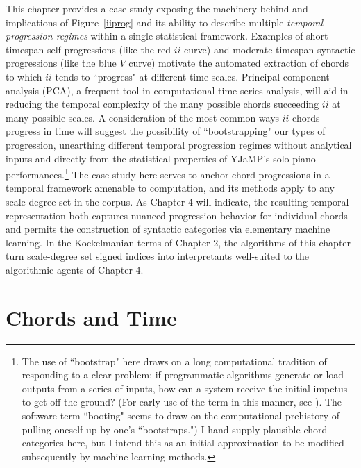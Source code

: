 This chapter provides a case study exposing the machinery behind and implications of Figure~\ref{iiprog} and its ability to describe multiple \emph{temporal progression regimes} within a single statistical framework.  Examples of short-timespan self-progressions (like the red $ii$ curve) and moderate-timespan syntactic progressions (like the blue $V$ curve) motivate the automated extraction of chords to which $ii$ tends to ``progress" at different time scales.  Principal component analysis (PCA), a frequent tool in computational time series analysis, will aid in reducing the temporal complexity of the many possible chords succeeding $ii$ at many possible scales.  A consideration of the most common ways $ii$ chords progress in time will suggest the possibility of ``bootstrapping" our types of progression, unearthing different temporal progression regimes without analytical inputs and directly from the statistical properties of YJaMP's solo piano performances.\footnote{The use of ``bootstrap" here draws on a long computational tradition of responding to a clear problem: if programmatic algorithms generate or load outputs from a series of inputs, how can a system receive the initial impetus to get off the ground?  (For early use of the term in this manner, see \cite{buchholz1953}).  The software term ``booting" seems to draw on the computational prehistory of pulling oneself up by one's ``bootstraps.")  I hand-supply plausible chord categories here, but I intend this as an initial approximation to be modified subsequently by machine learning methods.}  The case study here serves to anchor chord progressions in a temporal framework amenable to computation, and its methods apply to any scale-degree set in the corpus.  As Chapter 4 will indicate, the resulting temporal representation both captures nuanced progression behavior for individual chords and permits the construction of syntactic categories via elementary machine learning.  In the Kockelmanian terms of Chapter 2, the algorithms of this chapter turn scale-degree set signed indices into interpretants well-suited to the algorithmic agents of Chapter 4.

\section{Chords and Time}

